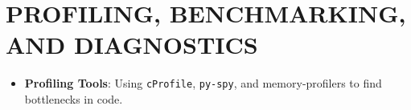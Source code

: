\hypertarget{profiling-benchmarking-and-diagnostics}{%
\chapter{PROFILING, BENCHMARKING, AND
DIAGNOSTICS}\label{profiling-benchmarking-and-diagnostics}}

\begin{itemize}
\tightlist
\item
  \textbf{Profiling Tools}: Using \passthrough{\lstinline!cProfile!},
  \passthrough{\lstinline!py-spy!}, and memory-profilers to find
  bottlenecks in code.
\end{itemize}
